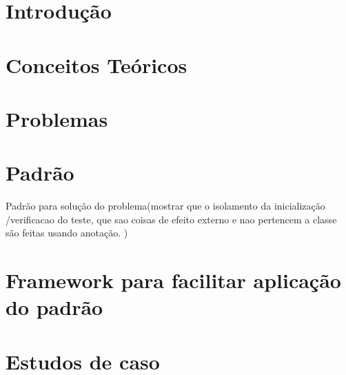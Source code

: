 \documentclass[12pt,a4paper,oneside]{book}
\begin{document}



\chapter{Introdução}

\chapter{Conceitos Teóricos}

\chapter{Problemas}


\chapter{Padrão}

Padrão para solução do problema(mostrar que o isolamento da inicialização /verificacao do teste, que sao coisas de efeito externo e nao pertencem a classe são feitas  usando anotação. )

\chapter{Framework para facilitar aplicação do padrão}

\chapter{Estudos de caso}
\end{document}
